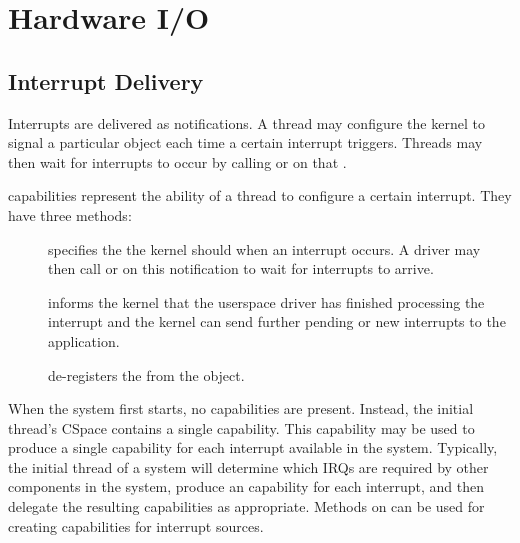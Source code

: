 %
%
%

\chapter{\label{ch:io}Hardware I/O}

\section{Interrupt Delivery}
\label{sec:interrupts}

Interrupts are delivered as notifications. A thread
may configure the kernel to signal a particular 
object each time a certain interrupt triggers. Threads may then wait for
interrupts to occur by calling  or
 on
that .


 capabilities represent the ability of a thread to
configure a certain interrupt. They have three methods:

\begin{description}
    \item[]
    specifies the  the kernel should
     when an interrupt occurs. A driver
    may then call  or 
    on this notification to
    wait for interrupts to arrive.

    \item[]
    informs the kernel that the userspace driver has finished processing
    the interrupt and the kernel can send further pending or new
    interrupts to the application.

    \item[]
    de-registers the  from the  object.
\end{description}

When the system first starts, no  capabilities are
present. Instead, the initial thread's CSpace contains a single
 capability. This capability may be used to produce
a single  capability for each interrupt available in the
system. Typically, the initial thread of a system will determine which
IRQs are required by other components in the system, produce an
 capability for each interrupt, and then delegate the
resulting capabilities as appropriate. Methods on  can
be used for creating  capabilities for interrupt sources.

